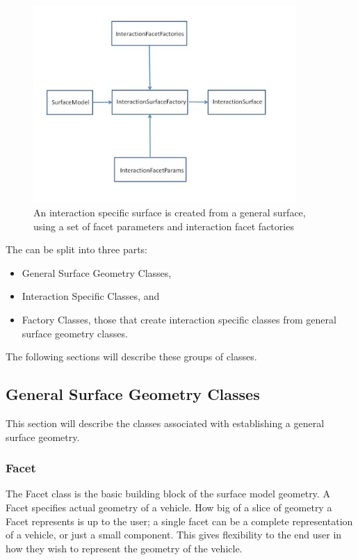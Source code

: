 \begin{figure}[H]
\begin{center}
\includegraphics[height=75mm]{figs/surface_flow.jpg}
\caption{An interaction specific surface is created from a general surface,
using a set of facet parameters and interaction facet factories}
\label{fig:surface_flow}
\end{center}
\end{figure}

The \ModelDesc can be split into three parts:

\begin{itemize}
\item{General Surface Geometry Classes},
\item{Interaction Specific Classes}, and
\item{Factory Classes}, those that create interaction specific classes from
general surface geometry classes.
\end{itemize}

The following sections will describe these groups of classes.

\subsection{General Surface Geometry Classes}

This section will describe the classes associated with establishing a general
surface geometry.

\subsubsection{Facet}

The Facet class is the basic building block of the surface model geometry.
A Facet specifies actual geometry of a vehicle. How big of a slice of geometry
a Facet represents is up to the user; a single
facet can be a complete representation of a
vehicle, or just a small component. This gives flexibility to the end user in how
they wish to represent the geometry of the vehicle. 

